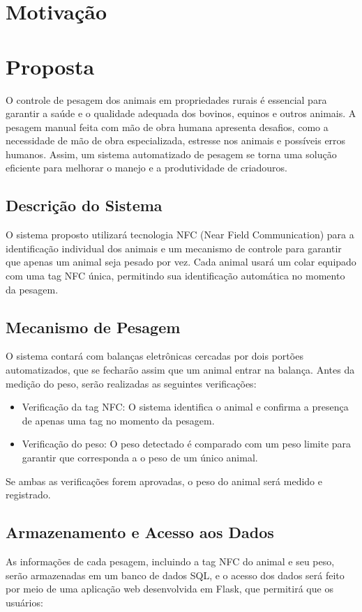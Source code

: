 \documentclass[11pt]{article}
\begin{document}
\section{Motivação}
\section{Proposta}
O controle de pesagem dos animais em propriedades rurais é essencial para garantir a saúde e o qualidade adequada dos bovinos, equinos e outros animais. A pesagem manual feita com mão de obra humana apresenta desafios, como a necessidade de mão de obra especializada, estresse nos animais e possíveis erros humanos. Assim, um sistema automatizado de pesagem se torna uma solução eficiente para melhorar o manejo e a produtividade de criadouros.

\subsection{Descrição do Sistema}
O sistema proposto utilizará tecnologia NFC (Near Field Communication) para a identificação individual dos animais e um mecanismo de controle para garantir que apenas um animal seja pesado por vez. Cada animal usará um colar equipado com uma tag NFC única, permitindo sua identificação automática no momento da pesagem.

\subsection{Mecanismo de Pesagem}
O sistema contará com balanças eletrônicas cercadas por dois portões automatizados, que se fecharão assim que um animal entrar na balança. Antes da medição do peso, serão realizadas as seguintes verificações:

\begin{itemize}
    \item Verificação da tag NFC: O sistema identifica o animal e confirma a presença de apenas uma tag no momento da pesagem.
    \item Verificação do peso: O peso detectado é comparado com um peso limite para garantir que corresponda a o peso de um único animal.
\end{itemize}

Se ambas as verificações forem aprovadas, o peso do animal será medido e registrado.

\subsection{Armazenamento e Acesso aos Dados}
As informações de cada pesagem, incluindo a tag NFC do animal e seu peso, serão armazenadas em um banco de dados SQL, e o acesso dos dados será feito por meio de uma aplicação web desenvolvida em Flask, que permitirá que os usuários:
\end{document}
